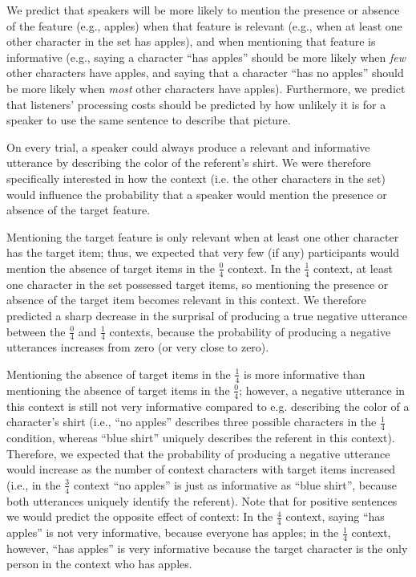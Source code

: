 \documentclass[man, noapacite]{apa2}
\begin{document}
We predict that speakers will be more likely to mention the presence or absence of the feature (e.g., apples) when that feature is relevant (e.g., when at least one other character in the set has apples), and when mentioning that feature is informative (e.g., saying a character ``has apples'' should be more likely when \emph{few} other characters have apples, and saying that a character ``has no apples'' should be more likely when \emph{most} other characters have apples). Furthermore, we predict that listeners' processing costs should be predicted by how unlikely it is for a speaker to use the same sentence to describe that picture. 

On every trial, a speaker could always produce a relevant and informative utterance by describing the color of the referent's shirt. We were therefore specifically interested in how the context (i.e. the other characters in the set) would influence the probability that a speaker would mention the presence or absence of the target feature. 

Mentioning the target feature is only relevant when at least one other character has the target item; thus, we expected that very few (if any) participants would mention the absence of target items in the $\frac{0}{4}$ context. In the $\frac{1}{4}$ context, at least one character in the set possessed target items, so mentioning the presence or absence of the target item becomes relevant in this context. We therefore predicted a sharp decrease in the surprisal of producing a true negative utterance between the $\frac{0}{4}$ and $\frac{1}{4}$ contexts, because the probability of producing a negative utterances increases from zero (or very close to zero).

Mentioning the absence of target items in the $\frac{1}{4}$ is more informative than mentioning the absence of target items in the $\frac{0}{4}$; however, a negative utterance in this context is still not very informative compared to e.g. describing the color of a character's shirt (i.e., ``no apples'' describes three possible characters in the $\frac{1}{4}$ condition, whereas ``blue shirt'' uniquely describes the referent in this context). Therefore, we expected that the probability of producing a negative utterance would increase as the number of context characters with target items increased (i.e., in the $\frac{3}{4}$ context ``no apples'' is just as informative as ``blue shirt'', because both utterances uniquely identify the referent). Note that for positive sentences we would predict the opposite effect of context: In the $\frac{4}{4}$ context, saying ``has apples'' is not very informative, because everyone has apples; in the $\frac{1}{4}$ context, however, ``has apples'' is very informative because the target character is the only person in the context who has apples. 
\end{document}
